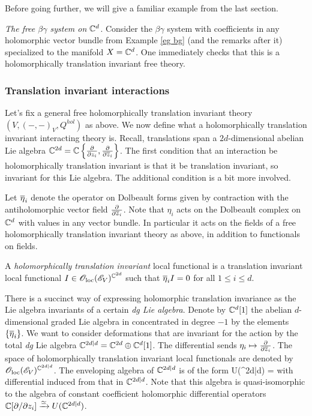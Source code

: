 Before going further, we will give a familiar example from the last section.

\begin{eg}\label{eg bg affine} {\em The free $\beta\gamma$ system on $\CC^d$}.
Consider the $\beta\gamma$ system with coefficients in any holomorphic vector bundle from Example \ref{eg bg} (and the remarks after it) specialized to the manifold $X = \CC^d$.
One immediately checks that this is a holomorphically translation invariant free theory.
\end{eg}


\subsubsection{Translation invariant interactions}


Let's fix a general free holomorphically translation invariant theory $(V, (-,-)_V, Q^{hol})$ as above.
We now define what a holomorphically translation invariant interacting theory is.
Recall, translations span a $2d$-dimensional abelian Lie algebra $\CC^{2d} = \CC\left\{\frac{\partial}{\partial z_i}, \frac{\partial}{\partial \zbar_i}\right\}$. 
The first condition that an interaction be holomorphically translation invariant is that it be translation invariant, so invariant for this Lie algebra.
The additional condition is a bit more involved.

Let $\Bar{\eta}_i$ denote the operator on Dolbeault forms given by contraction with the antiholomorphic vector field $\frac{\partial}{\partial \zbar_i}$. 
Note that $\eta_i$ acts on the Dolbeault complex on $\CC^d$ with values in any vector bundle.
In particular it acts on the fields of a free holomorphically translation invariant theory as above, in addition to functionals on fields.

\begin{dfn}
A {\em holomorphically translation invariant} local functional is a translation invariant local functional $I \in \oloc(\sE_V)^{\CC^{2d}}$ such that $\Bar{\eta}_i I = 0$ for all $1 \leq i \leq d$. 
\end{dfn}

There is a succinct way of expressing holomorphic translation invariance as the Lie algebra invariants of a certain {\em dg Lie algebra}.
Denote by $\CC^d[1]$ the abelian $d$-dimensional graded Lie algebra in concentrated in degree $-1$ by the elements $\{\Bar{\eta}_i\}$.
We want to consider deformations that are invariant for the action by the total {\em dg} Lie algebra $\CC^{2d|d} = \CC^{2d} \oplus \CC^d[1]$.
The differential sends $\eta_i \mapsto \frac{\partial}{\partial \zbar_i}$.
The space of holomorphically translation invariant local functionals are denoted by $\oloc(\sE_V)^{\CC^{2d|d}}$.
The enveloping algebra of $\CC^{2d|d}$ is of the form
\ben
U(\CC^{2d|d}) = \CC {}
\een
with differential induced from that in $\CC^{2d|d}$. 
Note that this algebra is quasi-isomorphic to the algebra of constant coefficient holomorphic differential operators $\CC[\partial / \partial z_i] \xto{\simeq} U(\CC^{2d|d})$. 

